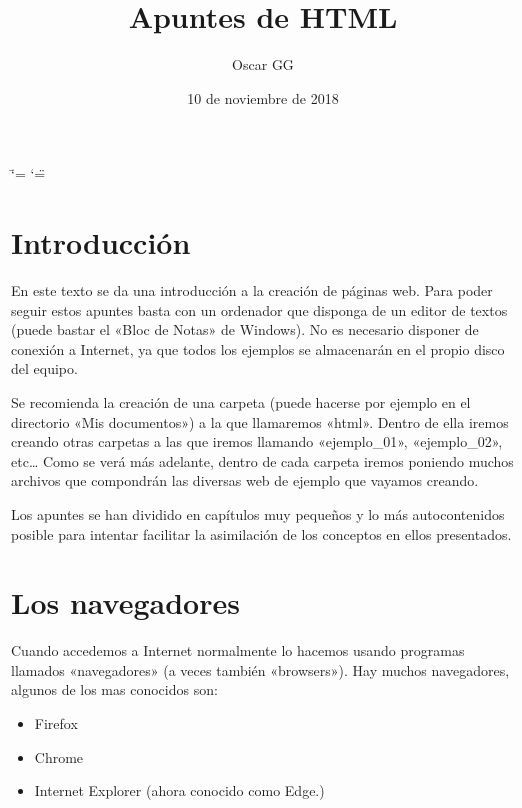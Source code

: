 \documentclass[a4paper,12pt,spanish]{sphinxmanual}
\title{Apuntes de HTML }
\date{10 de noviembre de 2018}
\author{Oscar GG}
\begin{document}
\ifdefined\shorthandoff
  \ifnum\catcode`\=\string=\active\shorthandoff{=}\fi
  \ifnum\catcode`\"=\active{}\fi
\fi

\pagestyle{empty}
\maketitle
\pagestyle{plain}
\sphinxtableofcontents
\pagestyle{normal}
\label{\detokenize{index::doc}}



\chapter{Introducción}
\label{\detokenize{index:introduccion}}
En este texto se da una introducción  a la creación de páginas web. Para poder seguir estos apuntes basta con un ordenador que disponga de un editor de textos (puede bastar el «Bloc de Notas» de Windows). No es necesario disponer de conexión a Internet, ya que todos los ejemplos se almacenarán en el propio disco del equipo.

Se recomienda la creación de una carpeta (puede hacerse por ejemplo en el directorio «Mis documentos») a la que llamaremos «html». Dentro de ella iremos creando otras carpetas a las que iremos llamando «ejemplo\_01», «ejemplo\_02», etc… Como se verá más adelante, dentro de cada carpeta iremos poniendo muchos archivos que compondrán las diversas web de ejemplo que vayamos creando.

Los apuntes se han dividido en capítulos muy pequeños y lo más autocontenidos posible para intentar facilitar la asimilación de los conceptos en ellos presentados.


\chapter{Los navegadores}
\label{\detokenize{index:los-navegadores}}
Cuando accedemos a Internet normalmente lo hacemos usando programas llamados «navegadores» (a veces también «browsers»). Hay muchos navegadores, algunos de los mas conocidos son:
\begin{itemize}
\item {} 
Firefox

\item {} 
Chrome

\item {} 
Internet Explorer (ahora conocido como Edge.)

\end{itemize}
\end{document}
